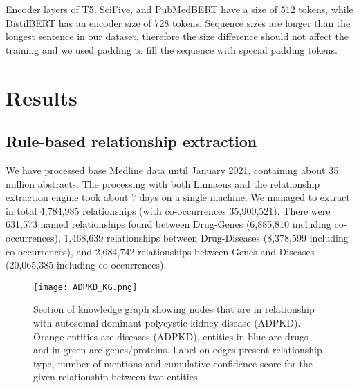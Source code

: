\documentclass[final,12pt,3p,times,twocolumn,authoryear]{elsarticle}
\begin{document}
Encoder layers of T5, SciFive, and PubMedBERT have a size of 512 tokens, while DistilBERT has an encoder size of 728 tokens. Sequence sizes are longer than the longest sentence in our dataset, therefore the size difference should not affect the training and we used padding to fill the sequence with special padding tokens. 



\section{Results}

\subsection{Rule-based relationship extraction}

We have processed base Medline data until January 2021, containing about 35 million abstracts. The processing with both Linnaeus and the relationship extraction engine took about 7 days on a single machine. We managed to extract in total 4,784,985 relationships (with co-occurrences 35,900,521). There were 631,573 named relationships found between Drug-Genes (6,885,810 including co-occurrences), 1,468,639 relationships between Drug-Diseases  (8,378,599 including co-occurrences), and  2,684,742 relationships between Genes and Diseases (20,065,385 including co-occurrences). 

  \begin{figure*}[h]
\caption{Section of knowledge graph showing nodes that are in relationship with autosomal dominant polycystic kidney disease (ADPKD). Orange entities are diseases (ADPKD), entities in blue are drugs and in green are genes/proteins.  Label on edges present relationship type, number of mentions and cumulative confidence score for the given relationship between two entities.  }
\centering
\texttt{[image: ADPKD\_KG.png]}
\label{fig:ADPKDKG}
\end{figure*}
\end{document}

